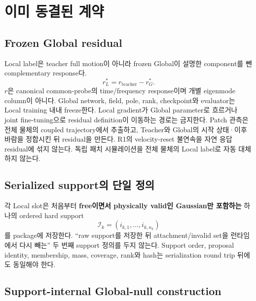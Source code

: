 \documentclass[10pt,a4paper]{article}
\begin{document}
\section{이미 동결된 계약}
\label{sec:r5-chapter-3}

\subsection{Frozen Global residual}

Local label은 teacher full motion이 아니라 frozen Global이 설명한 component를 뺀 complementary response다.
\[
  r_L^*=r_{\mathrm{teacher}}-r_G^* .
\]
\(r\)은 canonical common-probe의 time/frequency response이며 개별 eigenmode column이 아니다.
Global network, field, pole, rank, checkpoint와 evaluator는 Local training 내내 freeze한다.
Local gradient가 Global parameter로 흐르거나 joint fine-tuning으로 residual definition이 이동하는 경로는 금지한다.
Patch 관측은 전체 물체의 coupled trajectory에서 추출하고, Teacher와 Global의 시작 상태·이후 바람을
정합시킨 뒤 residual을 만든다. R1의 velocity-reset 불연속을 자연 응답 residual에 섞지 않는다.
독립 패치 시뮬레이션을 전체 물체의 Local label로 자동 대체하지 않는다.

\subsection{Serialized support의 단일 정의}

각 Local slot은 처음부터 \textbf{free이면서 physically valid인 Gaussian만 포함하는}
하나의 ordered hard support
\[
  \mathcal I_k=(i_{k,1},\ldots,i_{k,n_k})
\]
를 package에 저장한다. ``raw support를 저장한 뒤 attachment/invalid set을 런타임에서 다시 빼는''
두 번째 support 정의를 두지 않는다. Support order, proposal identity, membership, mass, coverage,
rank와 hash는 serialization round trip 뒤에도 동일해야 한다.

\subsection{Support-internal Global-null construction}
\end{document}
